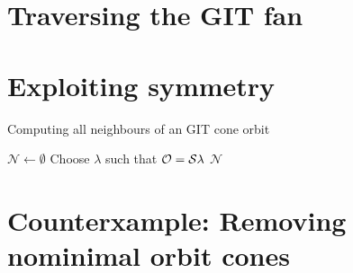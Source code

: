 \section{Traversing the GIT fan}





\section{Exploiting symmetry}


\begin{algorithm}
	\caption{Computing all neighbours of an GIT cone orbit}
	\label{algo:git_cone_orbitneighbours}
	
	\BlankLine
	$\mathcal{N} \leftarrow \emptyset$\;
	Choose $\lambda$ such that $\mathcal{O} = \mathcal{S}\lambda$\;
	\Return $\mathcal{N}$\;
\end{algorithm}

\section{Counterxample: Removing nominimal orbit cones}